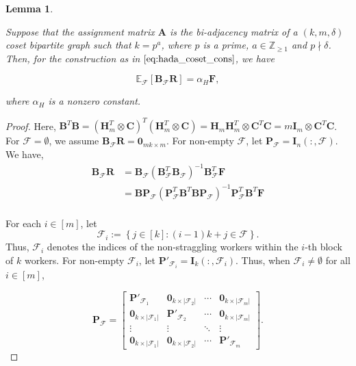 \documentclass[journal,draftcls,onecolumn]{IEEEtran}
\theoremstyle{mystyle}
\newtheorem{lemma}{Lemma}
\newcommand{\bfC}{\mathbf{C}}
\newcommand{\bfB}{\mathbf{B}}
\newcommand{\bfI}{\mathbf{I}}
\newcommand{\bfR}{\mathbf{R}}
\newcommand{\bfP}{\mathbf{P}}
\newcommand{\cF}{\mathcal{F}}
\newcommand{\sifat}[1]{\marginpar{+}{\bf Sifat's remark}: {\em #1}}
\begin{document}
\begin{lemma}
\label{lemma:Cost_Hadamard_Convergence}

Suppose that the assignment matrix $\mathbf{A}$ is the bi-adjacency matrix of a $(k, m, \delta)$ coset bipartite graph such that $k = p^a$, where $p$ is a prime, $a \in \mathbb{Z}_{\ge 1}$ and $p \nmid \delta$. Then, for the construction as in $\eqref{eq:hada_coset_cons}$, we have 

\[\mathbb{E}_{\mathcal{F}}[\mathbf{B}_{\cF} \mathbf{R}]= \alpha_H \mathbf{F},\]

where $\alpha_H$ is a nonzero constant.
\end{lemma}
\begin{proof}

Here, 
$\mathbf{B}^T \mathbf{B} = (\mathbf{H}_m^T \otimes \mathbf{C})^T  (\mathbf{H}_m^T \otimes \mathbf{C}) = \mathbf{H}_m\mathbf{H}_m^T \otimes \mathbf{C}^T \mathbf{C} = m \mathbf{I}_m \otimes \mathbf{C}^T \bfC$. For $\cF =\emptyset$, we assume $\bfB_{\cF} \bfR = \mathbf{0}_{mk \times m}$. For non-empty $\cF$,  let $\bfP_{\cF} = \bfI_n(:, \cF)$. We have, 
\begin{align*}
\mathbf{B}_{\mathcal{F}}\mathbf{R} &= \bfB_{\cF}(\bfB_{\cF}^T\bfB_{\cF})^{-1} \bfB_{\cF}^T \mathbf{F}\\
&=\mathbf{B} \mathbf{P}_{\mathcal{F}}(\mathbf{P}_\mathcal{F}^T \mathbf{B}^T\mathbf{B}\mathbf{P}_\mathcal{F})^{-1}\mathbf{P}_{\mathcal{F}}^T \bfB^T\mathbf{F}\\
\end{align*}

For each $i\in[m]$, let
\[
\mathcal{F}_i
:=
\left\{
j\in[k] : (i-1)k+j\in\mathcal{F}
\right\}.
\]
Thus, $\mathcal{F}_i$ denotes the indices of the non-straggling workers within the $i$-th block of $k$ workers. For non-empty $\cF_i$, let $\bfP'_{\cF_i} = \bfI_k(:, \cF_i)$. Thus, when $\cF_i \ne \emptyset$ for all $i \in [m]$,

\[
\mathbf{P}_{\mathcal{F}}
=
\begin{bmatrix}
\mathbf{P}'_{\mathcal{F}_1}
    & \mathbf{0}_{k\times |\mathcal{F}_2|}
    & \cdots
    & \mathbf{0}_{k\times |\mathcal{F}_m|}\\
\mathbf{0}_{k\times |\mathcal{F}_1|}
    & \mathbf{P}'_{\mathcal{F}_2}
    & \cdots
    & \mathbf{0}_{k\times |\mathcal{F}_m|}\\
\vdots
    & \vdots
    & \ddots
    & \vdots\\
\mathbf{0}_{k\times |\mathcal{F}_1|}
    & \mathbf{0}_{k\times |\mathcal{F}_2|}
    & \cdots
    & \mathbf{P}'_{\mathcal{F}_m}
\end{bmatrix}.
\]


\end{proof}
\end{document}
